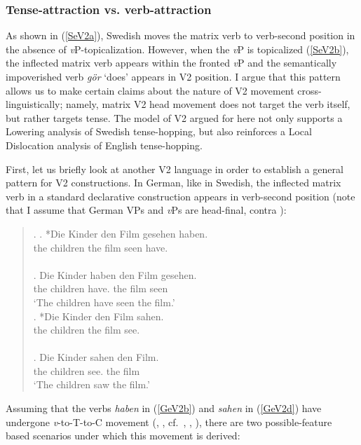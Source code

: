 \subsubsection{Tense-attraction vs. verb-attraction}

\noindent
As shown in (\ref{SeV2a}), Swedish moves the matrix verb to verb-second position in the absence of \textit{v}P-topicalization. However, when the \textit{v}P is topicalized (\ref{SeV2b}), the inflected matrix verb appears within the fronted \textit{v}P and the semantically impoverished verb \textit{g\"{o}r} `does' appears in V2 position. I argue that this pattern allows us to make certain claims about the nature of V2 movement cross-linguistically; namely, matrix V2 head movement does not target the verb itself, but rather targets tense. The model of V2 argued for here not only supports a Lowering analysis of Swedish tense-hopping, but also reinforces a Local Dislocation analysis of English tense-hopping.

First, let us briefly look at another V2 language in order to establish a general pattern for V2 constructions. In German, like in Swedish, the inflected matrix verb in a standard declarative construction appears in verb-second position (note that I assume that German VPs and \textit{v}Ps are head-final, contra ):

\singlespacing
\begin{quote}
\begin{minipage}{5.5in}
\ex. \label{GeV2}
\ag. *Die Kinder den Film gesehen haben. \label{GeV2a}\\
the children the film seen have.\\
\hspace{1pt}\\
\bg. Die Kinder haben den Film gesehen. \label{GeV2b}\\
the children have. the film seen\\
`The children have seen the film.'\\
\cg. *Die Kinder den Film sahen. \label{GeV2c}\\
the children the film see.\\
\hspace{1pt}\\
\dg. Die Kinder sahen den Film. \label{GeV2d}\\
the children see. the film\\
`The children saw the film.'\\

\end{minipage}
\end{quote}
\onehalfspacing
Assuming that the verbs \textit{haben} in (\ref{GeV2b}) and \textit{sahen} in (\ref{GeV2d}) have undergone \textit{v}-to-T-to-C movement (, , cf.\ , \citeyear{travis1986}, \citeyear{travis1991}), there are two possible-feature based scenarios under which this movement is derived:


